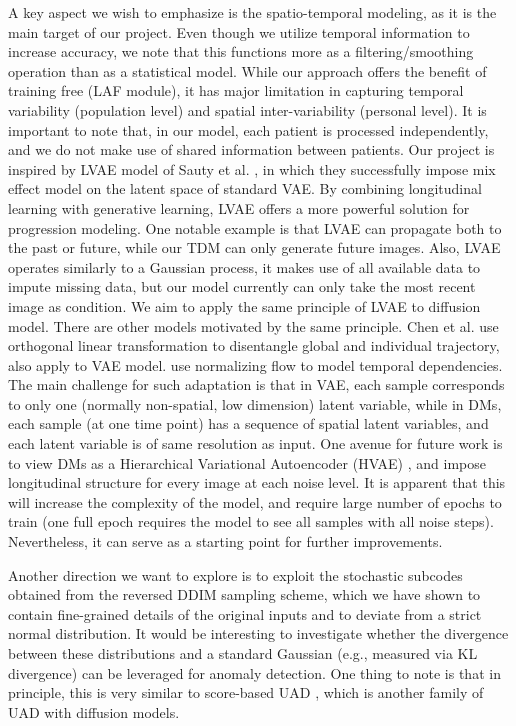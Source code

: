 A key aspect we wish to emphasize is the spatio-temporal modeling, as it is the main target of our project. Even though we utilize temporal information to increase accuracy, we note that this functions more as a filtering/smoothing operation than as a statistical model. While our approach offers the benefit of training free (LAF module), it has major limitation in capturing temporal variability (population level) and spatial inter-variability (personal level). It is important to note that, in our model, each patient is processed independently, and we do not make use of shared information between patients. Our project is inspired by LVAE model of Sauty et al. \cite{SautyLongitudinalVAE2022}, in which they successfully impose mix effect model on the latent space of standard \ac{VAE}. By combining longitudinal learning with generative learning, LVAE offers a more powerful solution for progression modeling. One notable example is that LVAE can propagate both to the past or future, while our TDM can only generate future images. Also, LVAE operates similarly to a Gaussian process, it makes use of all available data to impute missing data, but our model currently can only take the most recent image as condition. We aim to apply the same principle of LVAE to diffusion model. There are other models motivated by the same principle. Chen et al. \cite{chenOrthogonalMixedEffectsModelingLongitudinal} use orthogonal linear transformation to disentangle global and individual trajectory, also apply to \ac{VAE} model. \cite{ca23LongitudinalNormalizingFlow} use normalizing flow to model temporal dependencies. The main challenge for such adaptation is that in \ac{VAE}, each sample corresponds to only one (normally non-spatial, low dimension) latent variable, while in \ac{DMs}, each sample (at one time point) has a sequence of spatial latent variables, and each latent variable is of same resolution as input. One avenue for future work is to view \ac{DMs} as a Hierarchical Variational Autoencoder (HVAE) \cite{luoUnderstandingDiffusionModels2022}, and impose longitudinal structure for every image at each noise level. It is apparent that this will increase the complexity of the model, and require large number of epochs to train (one full epoch requires the model to see all samples with all noise steps). Nevertheless, it can serve as a starting point for further improvements. 

Another direction we want to explore is to exploit the stochastic subcodes obtained from the reversed DDIM sampling scheme, which we have shown to contain fine-grained details of the original inputs and to deviate from a strict normal distribution. It would be interesting to investigate whether the divergence between these distributions and a standard Gaussian (e.g., measured via KL divergence) can be leveraged for anomaly detection. One thing to note is that in principle, this is very similar to score-based \ac{UAD} \cite{wangEPDiffErasurePerception2025,pinaya2022fastUAD-DDPM}, which is another family of UAD with diffusion models. 

